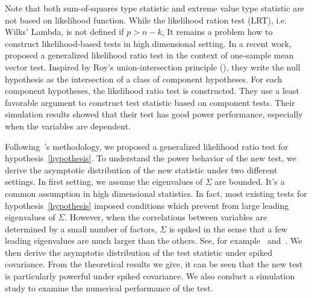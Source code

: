 \documentclass[review]{elsarticle}
\theoremstyle{plain}
\theoremstyle{definition}
\theoremstyle{remark}
\begin{document}
   Note that both sum-of-squares type statistic and extreme value type statistic are not based on likelihood function.
    While the likelihood ration test (LRT), i.e. Wilks' Lambda, is not defined if $p>n-k$,
    It remains a problem how to construct likelihood-based tests in high dimensional setting.
    In a recent work,~\cite{Zhao2016A} proposed a generalized likelihood ratio test in the context of one-sample mean vector test.
Inspired by Roy's union-intersection principle (\cite{Roy1953}),
    they write the null hypothesis as the intersection of a class of component hypotheses.
    For each component hypotheses, the likelihood ratio test is constructed.
    They use a least favorable argument to construct test statistic based on component tests.
    Their simulation results showed that their test has good power performance, especially when the variables are dependent.

    Following~\cite{Zhao2016A}'s methodology, we proposed a generalized likelihood ratio test for hypothesis~\eqref{hypothesis}.
    To understand the power behavior of the new test, we derive the asymptotic distribution of the new statistic under two different settings.
    In first setting, we assume the eigenvalues of $\Sigma$ are bounded.
    It's a common assumption in high dimensional statistics.
    In fact, most existing tests for hypothesis~\eqref{hypothesis} imposed conditions which prevent from large leading eigenvalues of $\Sigma$.
    However, when the correlations between variables are determined by a small number of factors, $\Sigma$ is spiked in the sense that a few leading eigenvalues are much larger than the others. See, for example~\cite{Cai2012Sparse} and~\cite{Shen2013Consistency}.
    We then derive the asymptotic distribution of the test statistic under spiked covariance.
    From the theoretical results we give, it can be seen that the new test is particularly powerful under spiked covariance.
    We also conduct a simulation study to examine the numerical performance of the test.
\end{document}

